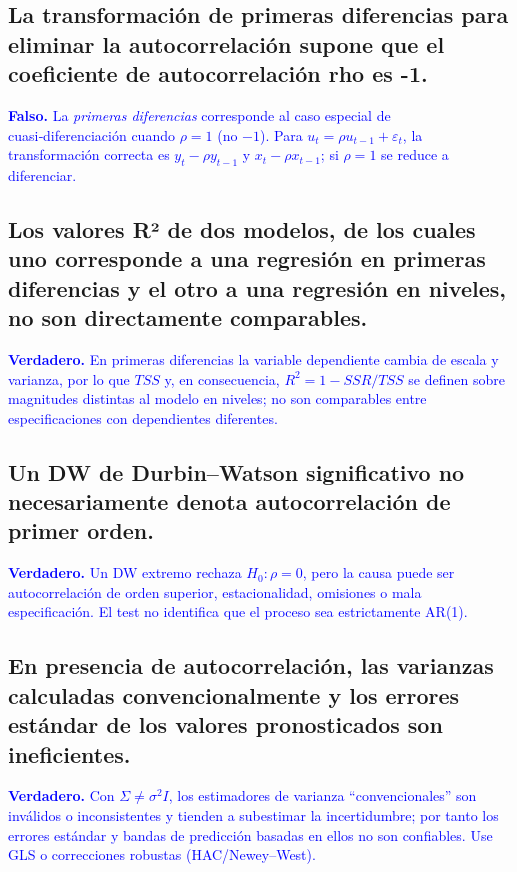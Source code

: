 \documentclass[10pt]{article}
\begin{document}
\subsection{La transformación de primeras diferencias para eliminar la autocorrelación supone que el coeficiente de autocorrelación rho es -1.}
\textcolor{blue}{
    \textbf{Falso.} La \emph{primeras diferencias} corresponde al caso especial de cuasi‑diferenciación cuando $\rho=1$ (no $-1$). Para $u_t=\rho u_{t-1}+\varepsilon_t$, la transformación correcta es $y_t-\rho y_{t-1}$ y $x_t-\rho x_{t-1}$; si $\rho=1$ se reduce a diferenciar.
}
\subsection{Los valores R² de dos modelos, de los cuales uno corresponde a una regresión en primeras diferencias y el otro a una regresión en niveles, no son directamente comparables.}
\textcolor{blue}{
    \textbf{Verdadero.} En primeras diferencias la variable dependiente cambia de escala y varianza, por lo que $TSS$ y, en consecuencia, $R^2=1-SSR/TSS$ se definen sobre magnitudes distintas al modelo en niveles; no son comparables entre especificaciones con dependientes diferentes.
}
\subsection{Un DW de Durbin--Watson significativo no necesariamente denota autocorrelación de primer orden.}
\textcolor{blue}{
    \textbf{Verdadero.} Un DW extremo rechaza $H_0:\rho=0$, pero la causa puede ser autocorrelación de orden superior, estacionalidad, omisiones o mala especificación. El test no identifica que el proceso sea estrictamente AR(1).
}
\subsection{En presencia de autocorrelación, las varianzas calculadas convencionalmente y los errores estándar de los valores pronosticados son ineficientes.}
\textcolor{blue}{
    \textbf{Verdadero.} Con $\Sigma\neq\sigma^2 I$, los estimadores de varianza “convencionales” son inválidos o inconsistentes y tienden a subestimar la incertidumbre; por tanto los errores estándar y bandas de predicción basadas en ellos no son confiables. Use GLS o correcciones robustas (HAC/Newey–West).
}
\end{document}
